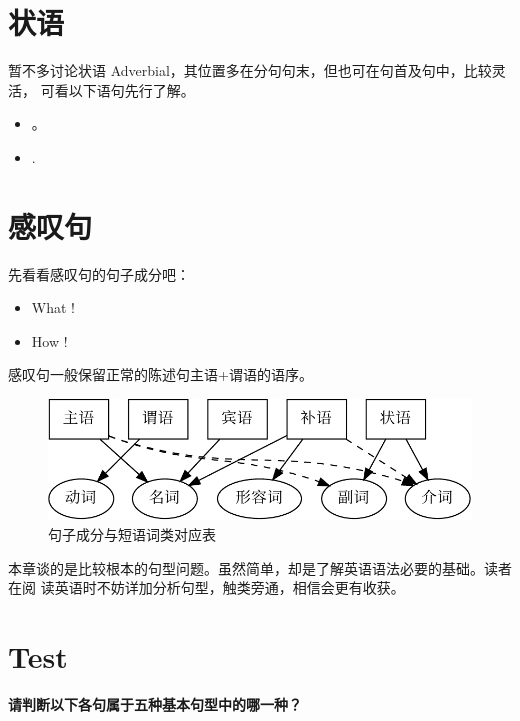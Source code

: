 \section{状语}

暂不多讨论状语 Adverbial，其位置多在分句句末，但也可在句首及句中，比较灵活，
可看以下语句先行了解。

\begin{itemize}
\item {}   
  。
\item {}    .
\end{itemize}

\section{感叹句}

先看看感叹句的句子成分吧：
\begin{itemize}
\item What   !
\item How    !
\end{itemize}

感叹句一般保留正常的陈述句主语+谓语的语序。

\begin{figure}[ht]
  \centering
  \includegraphics[width=0.7\linewidth]{svo.pdf}
  \caption{\label{fig:svo}句子成分与短语词类对应表}
\end{figure}

本章谈的是比较根本的句型问题。虽然简单，却是了解英语语法必要的基础。读者在阅
读英语时不妨详加分析句型，触类旁通，相信会更有收获。

\section{Test}

\textbf{请判断以下各句属于五种基本句型中的哪一种？}

